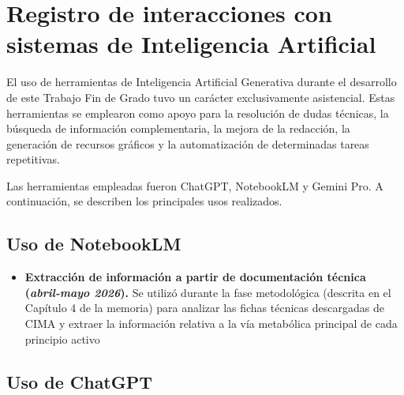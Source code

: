\section{Registro de interacciones con sistemas de Inteligencia Artificial}

El uso de herramientas de Inteligencia Artificial Generativa durante el desarrollo de este Trabajo Fin de Grado tuvo un carácter exclusivamente asistencial. Estas herramientas se emplearon como apoyo para la resolución de dudas técnicas, la búsqueda de información complementaria, la mejora de la redacción, la generación de recursos gráficos y la automatización de determinadas tareas repetitivas. 

Las herramientas empleadas fueron ChatGPT, NotebookLM y Gemini Pro. A continuación, se describen los principales usos realizados.

\subsection{Uso de NotebookLM}

\begin{itemize}
    \item \textbf{Extracción de información a partir de documentación técnica (\textit{abril-mayo 2026}).} Se utilizó durante la fase metodológica (descrita en el Capítulo 4 de la memoria) para analizar las fichas técnicas descargadas de CIMA y extraer la información relativa a la vía metabólica principal de cada principio activo
\end{itemize}

\subsection{Uso de ChatGPT}

